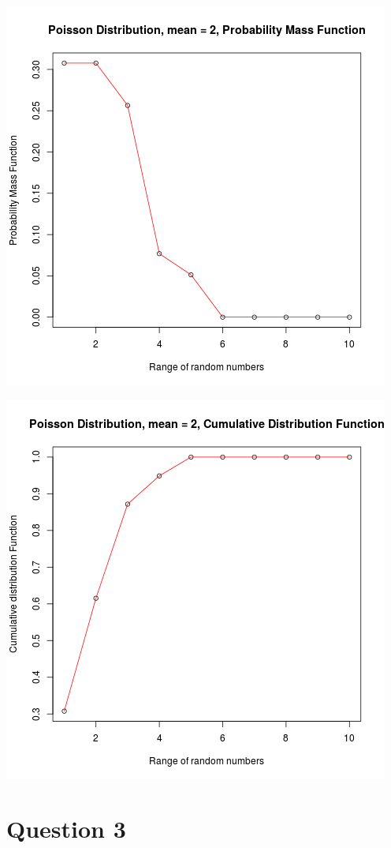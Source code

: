 \documentclass{article}
\begin{document}
\includegraphics{"plot2b"}
\pagebreak

\includegraphics{"plot2c"}
\pagebreak

\section{Question 3}
\end{document}
